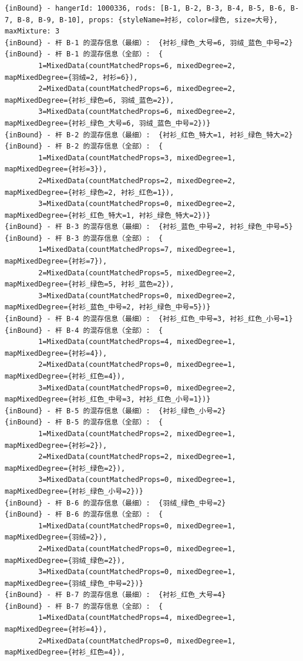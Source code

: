 {\begin{verbatim}
{inBound} - hangerId: 1000336, rods: [B-1, B-2, B-3, B-4, B-5, B-6, B-7, B-8, B-9, B-10], props: {styleName=衬衫, color=绿色, size=大号}, maxMixture: 3
{inBound} - 杆 B-1 的混存信息（最细）:  {衬衫_绿色_大号=6, 羽绒_蓝色_中号=2}
{inBound} - 杆 B-1 的混存信息（全部）:  {
		1=MixedData(countMatchedProps=6, mixedDegree=2, mapMixedDegree={羽绒=2, 衬衫=6}), 
		2=MixedData(countMatchedProps=6, mixedDegree=2, mapMixedDegree={衬衫_绿色=6, 羽绒_蓝色=2}), 
		3=MixedData(countMatchedProps=6, mixedDegree=2, mapMixedDegree={衬衫_绿色_大号=6, 羽绒_蓝色_中号=2})}
{inBound} - 杆 B-2 的混存信息（最细）:  {衬衫_红色_特大=1, 衬衫_绿色_特大=2}
{inBound} - 杆 B-2 的混存信息（全部）:  {
		1=MixedData(countMatchedProps=3, mixedDegree=1, mapMixedDegree={衬衫=3}), 
		2=MixedData(countMatchedProps=2, mixedDegree=2, mapMixedDegree={衬衫_绿色=2, 衬衫_红色=1}), 
		3=MixedData(countMatchedProps=0, mixedDegree=2, mapMixedDegree={衬衫_红色_特大=1, 衬衫_绿色_特大=2})}
{inBound} - 杆 B-3 的混存信息（最细）:  {衬衫_蓝色_中号=2, 衬衫_绿色_中号=5}
{inBound} - 杆 B-3 的混存信息（全部）:  {
		1=MixedData(countMatchedProps=7, mixedDegree=1, mapMixedDegree={衬衫=7}), 
		2=MixedData(countMatchedProps=5, mixedDegree=2, mapMixedDegree={衬衫_绿色=5, 衬衫_蓝色=2}), 
		3=MixedData(countMatchedProps=0, mixedDegree=2, mapMixedDegree={衬衫_蓝色_中号=2, 衬衫_绿色_中号=5})}
{inBound} - 杆 B-4 的混存信息（最细）:  {衬衫_红色_中号=3, 衬衫_红色_小号=1}
{inBound} - 杆 B-4 的混存信息（全部）:  {
		1=MixedData(countMatchedProps=4, mixedDegree=1, mapMixedDegree={衬衫=4}), 
		2=MixedData(countMatchedProps=0, mixedDegree=1, mapMixedDegree={衬衫_红色=4}), 
		3=MixedData(countMatchedProps=0, mixedDegree=2, mapMixedDegree={衬衫_红色_中号=3, 衬衫_红色_小号=1})}
{inBound} - 杆 B-5 的混存信息（最细）:  {衬衫_绿色_小号=2}
{inBound} - 杆 B-5 的混存信息（全部）:  {
		1=MixedData(countMatchedProps=2, mixedDegree=1, mapMixedDegree={衬衫=2}), 
		2=MixedData(countMatchedProps=2, mixedDegree=1, mapMixedDegree={衬衫_绿色=2}), 
		3=MixedData(countMatchedProps=0, mixedDegree=1, mapMixedDegree={衬衫_绿色_小号=2})}
{inBound} - 杆 B-6 的混存信息（最细）:  {羽绒_绿色_中号=2}
{inBound} - 杆 B-6 的混存信息（全部）:  {
		1=MixedData(countMatchedProps=0, mixedDegree=1, mapMixedDegree={羽绒=2}), 
		2=MixedData(countMatchedProps=0, mixedDegree=1, mapMixedDegree={羽绒_绿色=2}), 
		3=MixedData(countMatchedProps=0, mixedDegree=1, mapMixedDegree={羽绒_绿色_中号=2})}
{inBound} - 杆 B-7 的混存信息（最细）:  {衬衫_红色_大号=4}
{inBound} - 杆 B-7 的混存信息（全部）:  {
		1=MixedData(countMatchedProps=4, mixedDegree=1, mapMixedDegree={衬衫=4}), 
		2=MixedData(countMatchedProps=0, mixedDegree=1, mapMixedDegree={衬衫_红色=4}), 

\end{verbatim}}

